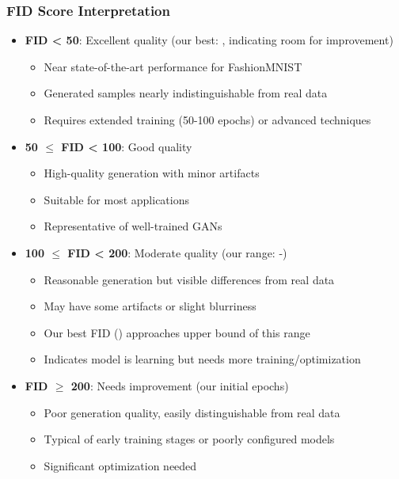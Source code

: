 \documentclass[conference,12pt]{IEEEtran}
\begin{document}
\subsubsection{FID Score Interpretation}

\begin{itemize}
    \item \textbf{FID < 50}: Excellent quality (our best: \BestFID, indicating room for improvement)
    \begin{itemize}
        \item Near state-of-the-art performance for FashionMNIST
        \item Generated samples nearly indistinguishable from real data
        \item Requires extended training (50-100 epochs) or advanced techniques
    \end{itemize}
    \item \textbf{50 $\leq$ FID < 100}: Good quality
    \begin{itemize}
        \item High-quality generation with minor artifacts
        \item Suitable for most applications
        \item Representative of well-trained GANs
    \end{itemize}
    \item \textbf{100 $\leq$ FID < 200}: Moderate quality (our range: \BestFID{}-\FinalFID)
    \begin{itemize}
        \item Reasonable generation but visible differences from real data
        \item May have some artifacts or slight blurriness
        \item Our best FID (\BestFID) approaches upper bound of this range
        \item Indicates model is learning but needs more training/optimization
    \end{itemize}
    \item \textbf{FID $\geq$ 200}: Needs improvement (our initial epochs)
    \begin{itemize}
        \item Poor generation quality, easily distinguishable from real data
        \item Typical of early training stages or poorly configured models
        \item Significant optimization needed
    \end{itemize}
\end{itemize}
\end{document}

